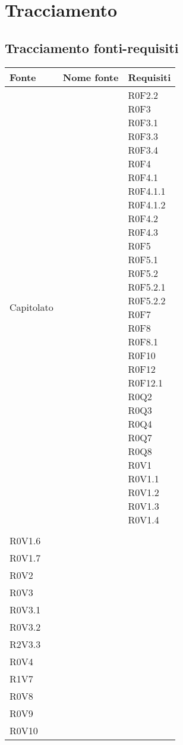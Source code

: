 \documentclass[AnalisiDeiRequisiti.tex]{subfiles}
\begin{document}
\section{Tracciamento}
\subsection{Tracciamento fonti-requisiti}

\label{table:Tabella di tracciamento fonti-requisiti}


\renewcommand*{\arraystretch}{1.2}
\begin{longtable}[H]{p{2cm}p{5cm}p{5cm}}
	\rowcolor{CHeader} 
	\color{CHeaderText} \textbf{Fonte} & \color{CHeaderText} \textbf{Nome fonte} & \color{CHeaderText} \textbf{Requisiti} \\
	\endhead
	Capitolato & & \makecell[tl]{ R0F2.2 \\
	 R0F3 \\
	 R0F3.1 \\
	 R0F3.3 \\
	 R0F3.4 \\
	 R0F4 \\
	 R0F4.1 \\
	 R0F4.1.1 \\
	 R0F4.1.2 \\
	 R0F4.2 \\
	 R0F4.3 \\
	 R0F5 \\
	 R0F5.1 \\
	 R0F5.2 \\
	 R0F5.2.1 \\
	 R0F5.2.2 \\
	 R0F7 \\
	 R0F8 \\
	 R0F8.1 \\
	 R0F10 \\
	 R0F12\\
	 R0F12.1 \\
	 R0Q2 \\
	 R0Q3 \\
	 R0Q4 \\
	 R0Q7 \\
	 R0Q8 \\
	 R0V1 \\
	 R0V1.1 \\
	 R0V1.2 \\
	 R0V1.3 \\
	 R0V1.4 } \\
\rowcolor{CRigheDispari}
& & \makecell[tl]{ %
	 R0V1.5 \\
	 R0V1.6 \\
	 R0V1.7 \\
	 R0V2 \\
	 R0V3 \\
	 R0V3.1 \\
	 R0V3.2 \\
	 R2V3.3 \\
	 R0V4 \\
	 R1V7 \\
	 R0V8 \\
	 R0V9 \\
	 R0V10 } \\
	

\end{longtable}
\end{document}
